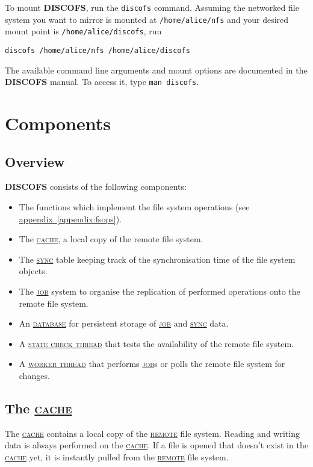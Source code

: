 \documentclass[a4paper]{article}
\newcommand{\software}[1]{\textsc{\textbf{#1}}\xspace}
\newcommand{\discofs}{\software{DISCOFS}}
\newcommand{\keyword}[1]{\hyperref[keyword:#1]{\textsc{#1}}\xspace}
\newcommand{\job}{\keyword{job}}
\newcommand{\jobs}{\job{}s\xspace}
\newcommand{\sync}{\keyword{sync}}
\newcommand{\cache}{\keyword{cache}}
\newcommand{\remote}{\keyword{remote}}
\newcommand{\database}{\keyword{database}}
\newcommand{\workerthread}{\hyperref[keyword:workerthread]{\textsc{worker thread}}\xspace}
\newcommand{\statecheckthread}{\hyperref[keyword:statecheckthread]{\textsc{state check thread}}\xspace}
\begin{document}
To mount \discofs, run the \lstinline|discofs| command. Assuming the networked
file system you want to mirror is mounted at \lstinline|/home/alice/nfs| and
your desired mount point is \lstinline|/home/alice/discofs|, run
\begin{lstlisting}
discofs /home/alice/nfs /home/alice/discofs
\end{lstlisting}

The available command line arguments and mount options are documented in the
\discofs manual. To access it, type \lstinline|man discofs|.

\lstset{language=C}



\section{Components} %

\subsection{Overview} %
\discofs consists of the following components:

\begin{itemize}
	\item The functions which implement the file system operations (see
		\hyperref[appendix:fsops]{appendix~\ref{appendix:fsops}}).
	\item The \cache, a local copy of the remote file system.
	\item The \sync table keeping track of the synchronisation time of the file
		system objects.
	\item The \job system to organise the replication of performed operations
		onto the remote file system.
	\item An \database for persistent storage of \job and \sync data.
	\item A \statecheckthread that tests the availability of the remote file
		system.
	\item A \workerthread that performs \jobs or polls the remote file system
		for changes.
\end{itemize}

\subsection{The \cache} %
\label{keyword:cache}
The \cache contains a local copy of the \remote file system. Reading and writing
data is always performed on the \cache. If a file is opened that doesn't exist
in the \cache yet, it is instantly pulled from the \remote file system.
\end{document}
